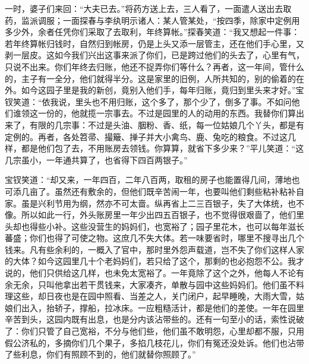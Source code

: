 \documentclass[12pt,oneside]{book}
\begin{document}
一时，婆子们来回：“大夫已去。”将药方送上去，三人看了，一面遣人送出去取药，监派调服；一面探春与李纨明示诸人：某人管某处，“按四季，除家中定例用多少外，余者任凭你们采取了去取利，年终算帐。”探春笑道：“我又想起一件事：若年终算帐归钱时，自然归到帐房，仍是上头又添一层管主，还在他们手心里，又剥一层皮。这如今我们兴出这事来派了你们，已是跨过他们的头去了，心里有气，只说不出来。你们年终去归账，他还不捉弄你们等什么？再者，这一年间，管什么的，主子有一全分，他们就得半分。这是家里的旧例，人所共知的，别的偷着的在外。如今这园子里是我的新创，竟别入他们手，每年归账，竟归到里头来才好。”宝钗笑道：“依我说，里头也不用归账，这个多了，那个少了，倒多了事。不如问他们谁领这一份的，他就揽一宗事去。不过是园里的人的动用的东西。我替你们算出来了，有限的几宗事：不过是头油、胭粉、香、纸，每一位姑娘几个丫头，都是有定例的。再者，各处笤帚、撮簸、掸子并大小禽鸟、鹿、兔吃的粮食。不过这几样，都是他们包了去，不用账房去领钱。你算算，就省下多少来？”平儿笑道：“这几宗虽小，一年通共算了，也省得下四百两银子。”

宝钗笑道：“却又来，一年四百，二年八百两，取租的房子也能置得几间，薄地也可添几亩了。虽然还有敷余的，但他们既辛苦闹一年，也要叫他们剩些粘补粘补自家。虽是兴利节用为纲，然亦不可太啬。纵再省上二三百银子，失了大体统，也不像。所以如此一行，外头账房里一年少出四五百银子，也不觉得很艰啬了，他们里头却也得些小补。这些没营生的妈妈们，也宽裕了；园子里花木，也可以每年滋长蕃盛；你们也得了可使之物。这庶几不失大体。若一味要省时，哪里不搜寻出几个钱来。凡有些余利的，一概入了官中，那时里外怨声载道，岂不失了你们这样人家的大体？如今这园里几十个老妈妈们，若只给了这个，那剩的也必抱怨不公。我才说的，他们只供给这几样，也未免太宽裕了。一年竟除了这个之外，他每人不论有余无余，只叫他拿出若干贯钱来，大家凑齐，单散与园中这些妈妈们。他们虽不料理这些，却日夜也是在园中照看、当差之人，关门闭户，起早睡晚，大雨大雪，姑娘们出入，抬轿子，撑船，拉冰床。一应粗糙活计，都是他们的差使。一年在园里辛苦到头，这园内既有出息，也是分内该沾带些的。还有一句至小的话，索性说破了：你们只管了自己宽裕，不分与他们些，他们虽不敢明怨，心里却都不服，只用假公济私的，多摘你们几个果子，多掐几枝花儿，你们有冤还没处诉。他们也沾带了些利息，你们有照顾不到的，他们就替你照顾了。”
\end{document}
